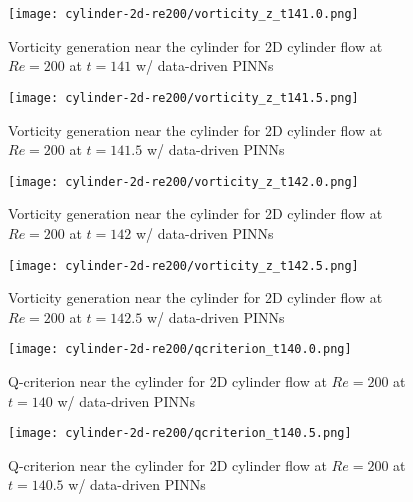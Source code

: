 \begin{figure}[!hbt]
    \centering%
    \texttt{[image: cylinder-2d-re200/vorticity\_z\_t141.0.png]}%
    \caption{%
        Vorticity generation near the cylinder for 2D cylinder flow at $Re=\num{200}$ at $t=141$ w/ data-driven PINNs
    }
    \label{fig:cylinder-re200-pinn-vort-gen-t141.0}%
\end{figure}

\begin{figure}[!hbt]
    \centering%
    \texttt{[image: cylinder-2d-re200/vorticity\_z\_t141.5.png]}%
    \caption{%
        Vorticity generation near the cylinder for 2D cylinder flow at $Re=\num{200}$ at $t=141.5$ w/ data-driven PINNs
    }
    \label{fig:cylinder-re200-pinn-vort-gen-t141.5}%
\end{figure}

\begin{figure}[!hbt]
    \centering%
    \texttt{[image: cylinder-2d-re200/vorticity\_z\_t142.0.png]}%
    \caption{%
        Vorticity generation near the cylinder for 2D cylinder flow at $Re=\num{200}$ at $t=142$ w/ data-driven PINNs
    }
    \label{fig:cylinder-re200-pinn-vort-gen-t142.0}%
\end{figure}

\begin{figure}[!hbt]
    \centering%
    \texttt{[image: cylinder-2d-re200/vorticity\_z\_t142.5.png]}%
    \caption{%
        Vorticity generation near the cylinder for 2D cylinder flow at $Re=\num{200}$ at $t=142.5$ w/ data-driven PINNs
    }
    \label{fig:cylinder-re200-pinn-vort-gen-t142.5}%
\end{figure}

\begin{figure}[!hbt]
    \centering%
    \texttt{[image: cylinder-2d-re200/qcriterion\_t140.0.png]}%
    \caption{%
        Q-criterion near the cylinder for 2D cylinder flow at $Re=\num{200}$ at $t=140$ w/ data-driven PINNs
    }
    \label{fig:cylinder-re200-pinn-qcrit-t140.0}%
\end{figure}

\begin{figure}[!hbt]
    \centering%
    \texttt{[image: cylinder-2d-re200/qcriterion\_t140.5.png]}%
    \caption{%
        Q-criterion near the cylinder for 2D cylinder flow at $Re=\num{200}$ at $t=140.5$ w/ data-driven PINNs
    }
    \label{fig:cylinder-re200-pinn-qcrit-t140.5}%
\end{figure}

